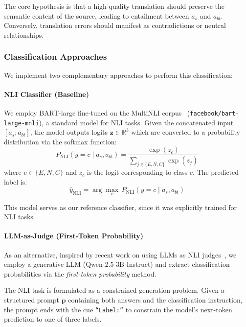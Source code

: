    The core hypothesis is that a high-quality translation should preserve the semantic content of the source, leading to entailment between $a_s$ and $a_{bt}$. Conversely, translation errors should manifest as contradictions or neutral relationships.

    \subsubsection{Classification Approaches}

    We implement two complementary approaches to perform this classification:

    \paragraph{NLI Classifier (Baseline)}
    We employ BART-large fine-tuned on the MultiNLI corpus~\cite{williams2018multinli} (\texttt{facebook/bart-large-mnli}), a standard model for NLI tasks. Given the concatenated input $[a_s; a_{bt}]$, the model outputs logits $\mathbf{z} \in \mathbb{R}^3$ which are converted to a probability distribution via the softmax function:
    \begin{equation}
        P_{\text{NLI}}(y = c \mid a_s, a_{bt}) = \frac{\exp(z_c)}{\sum_{j \in \{E, N, C\}} \exp(z_j)}
    \end{equation}
    where $c \in \{E, N, C\}$ and $z_c$ is the logit corresponding to class $c$. The predicted label is:
    \begin{equation}
        \hat{y}_{\text{NLI}} = \arg\max_{c} \, P_{\text{NLI}}(y = c \mid a_s, a_{bt})
    \end{equation}

    This model serves as our reference classifier, since it was explicitly trained for NLI tasks.

    \paragraph{LLM-as-Judge (First-Token Probability)}
    As an alternative, inspired by recent work on using LLMs as NLI judges~\cite{chen2024seeing}, we employ a generative LLM (Qwen-2.5 3B Instruct) and extract classification probabilities via the \textit{first-token probability} method.

    The NLI task is formulated as a constrained generation problem. Given a structured prompt $\mathbf{p}$ containing both answers and the classification instruction, the prompt ends with the cue \texttt{``Label:''} to constrain the model's next-token prediction to one of three labels.

